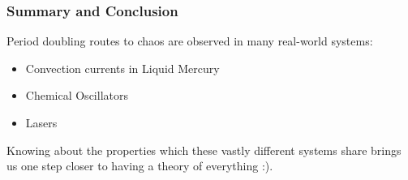 \documentclass[
	11pt, %
	aspectratio=169, %
]{beamer}
\begin{document}

\begin{frame}
        \frametitle{Summary and Conclusion}
        Period doubling routes to chaos are observed in many real-world systems:
        \begin{itemize}
            \item Convection currents in Liquid Mercury 
            \item Chemical Oscillators 
            \item Lasers 
        \end{itemize}
        Knowing about the properties which these vastly different systems share brings us one step closer to having a theory of everything :).
\end{frame}

\end{document}
